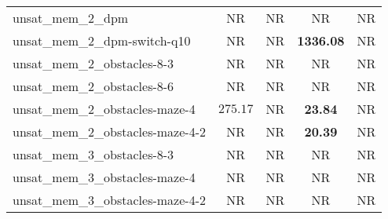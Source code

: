 \begin{tabular}{lcccc}
unsat\_mem\_2\_dpm & NR & NR & NR & NR \\
unsat\_mem\_2\_dpm-switch-q10 & NR & NR & \textbf{1336.08} & NR \\
unsat\_mem\_2\_obstacles-8-3 & NR & NR & NR & NR \\
unsat\_mem\_2\_obstacles-8-6 & NR & NR & NR & NR \\
unsat\_mem\_2\_obstacles-maze-4 & $275.17$ & NR & \textbf{23.84} & NR \\
unsat\_mem\_2\_obstacles-maze-4-2 & NR & NR & \textbf{20.39} & NR \\
unsat\_mem\_3\_obstacles-8-3 & NR & NR & NR & NR \\
unsat\_mem\_3\_obstacles-maze-4 & NR & NR & NR & NR \\
unsat\_mem\_3\_obstacles-maze-4-2 & NR & NR & NR & NR \\
\bottomrule
\end{tabular}
